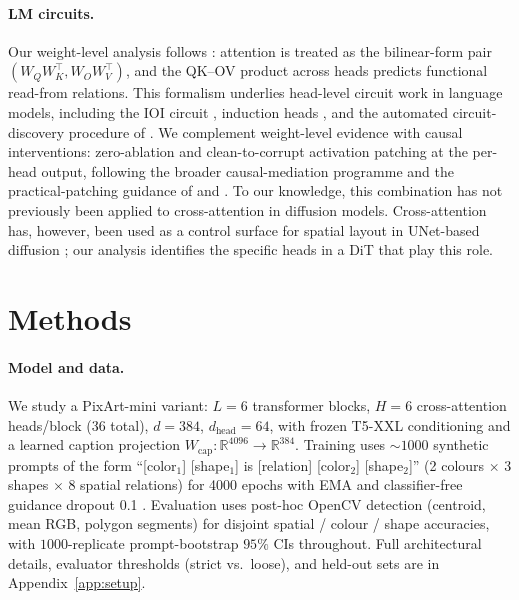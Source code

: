 \documentclass{article}
\theoremstyle{plain}
\theoremstyle{definition}
\begin{document}
\paragraph{LM circuits.}
Our weight-level analysis follows \citet{elhage2021mathematical}: attention is treated as the bilinear-form pair $(W_QW_K^\top, W_OW_V^\top)$, and the QK--OV product across heads predicts functional read-from relations. This formalism underlies head-level circuit work in language models, including the IOI circuit \citep{wang2023interpretability}, induction heads \citep{olsson2022induction}, and the automated circuit-discovery procedure of \citet{conmy2023acdc}. We complement weight-level evidence with causal interventions: zero-ablation and clean-to-corrupt activation patching at the per-head output, following the broader causal-mediation programme \citep{meng2022locating,geiger2021causal} and the practical-patching guidance of \citet{heimersheim2024patching} and \citet{zhang2024towards}. To our knowledge, this combination has not previously been applied to cross-attention in diffusion models. Cross-attention has, however, been used as a control surface for spatial layout in UNet-based diffusion \citep{chefer2023attend,hertz2023prompt}; our analysis identifies the specific heads in a DiT that play this role.

\section{Methods}

\paragraph{Model and data.}
We study a PixArt-mini \citep{chen2024pixart} variant: $L{=}6$ transformer blocks, $H{=}6$ cross-attention heads/block (36 total), $d{=}384$, $d_\text{head}{=}64$, with frozen T5-XXL conditioning \citep{raffel2020t5} and a learned caption projection $W_\text{cap}\!:\!\mathbb{R}^{4096}\!\to\!\mathbb{R}^{384}$. Training uses $\sim\!1000$ synthetic prompts of the form ``[color$_1$] [shape$_1$] is [relation] [color$_2$] [shape$_2$]'' (2 colours $\times$ 3 shapes $\times$ 8 spatial relations) for 4000 epochs with EMA and classifier-free guidance dropout 0.1 \citep{ho2022classifier}. Evaluation uses post-hoc OpenCV detection (centroid, mean RGB, polygon segments) for disjoint spatial / colour / shape accuracies, with $1000$-replicate prompt-bootstrap $95\%$ CIs throughout. Full architectural details, evaluator thresholds (strict vs.\ loose), and held-out sets are in Appendix~\ref{app:setup}.
\end{document}
